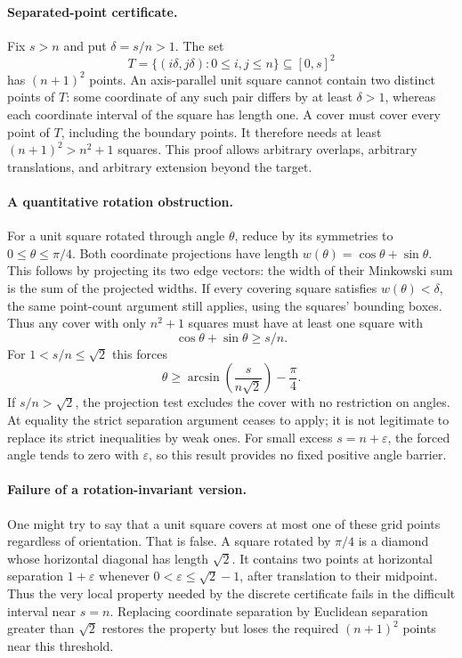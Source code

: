 \documentclass[11pt,a4paper]{article}
\begin{document}
\paragraph{Separated-point certificate.}
Fix $s>n$ and put $\delta=s/n>1$. The set
\[
 T=\{(i\delta,j\delta):0\le i,j\le n\}\subseteq[0,s]^2
\]
has $(n+1)^2$ points. An axis-parallel unit square cannot contain two distinct
points of $T$: some coordinate of any such pair differs by at least
$\delta>1$, whereas each coordinate interval of the square has length one.
A cover must cover every point of $T$, including the boundary points.
It therefore needs at least $(n+1)^2>n^2+1$ squares. This proof allows arbitrary
overlaps, arbitrary translations, and arbitrary extension beyond the target.

\paragraph{A quantitative rotation obstruction.}
For a unit square rotated through angle $\theta$, reduce by its symmetries
to $0\le\theta\le\pi/4$. Both coordinate projections have length
$w(\theta)=\cos\theta+\sin\theta$. This follows by projecting its two edge
vectors: the width of their Minkowski sum is the sum of the projected widths.
If every covering square satisfies $w(\theta)<\delta$, the same point-count
argument still applies, using the squares' bounding boxes. Thus any cover
with only $n^2+1$ squares must have at least one square with
\[
 \cos\theta+\sin\theta\ge s/n.
\]
For $1<s/n\le\sqrt2$ this forces
\[
 \theta\ge\arcsin\!\left(\frac{s}{n\sqrt2}\right)-\frac\pi4.
\]
If $s/n>\sqrt2$, the projection test excludes the cover with no restriction
on angles. At equality the strict separation argument ceases to apply;
it is not legitimate to replace its strict inequalities by weak ones.
For small excess $s=n+\varepsilon$, the forced angle tends to zero with
$\varepsilon$, so this result provides no fixed positive angle barrier.

\paragraph{Failure of a rotation-invariant version.}
One might try to say that a unit square covers at most one of these grid
points regardless of orientation. That is false. A square rotated by
$\pi/4$ is a diamond whose horizontal diagonal has length $\sqrt2$.
It contains two points at horizontal separation $1+\varepsilon$ whenever
$0<\varepsilon\le\sqrt2-1$, after translation to their midpoint.
Thus the very local property needed by the discrete certificate fails in
the difficult interval near $s=n$. Replacing coordinate separation by
Euclidean separation greater than $\sqrt2$ restores the property but loses
the required $(n+1)^2$ points near this threshold.
\end{document}
